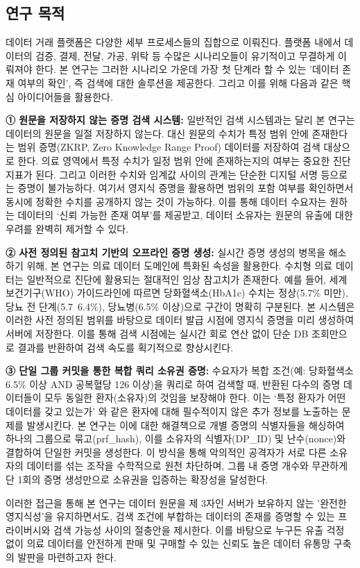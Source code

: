 \subsection{연구 목적}

데이터 거래 플랫폼은 다양한 세부 프로세스들의 집합으로 이뤄진다. 플랫폼 내에서 데이터의 검증, 결제, 전달, 가공, 위탁 등 수많은 시나리오들이 유기적이고 무결하게 이뤄져야 한다. 본 연구는 그러한 시나리오 가운데 가장 첫 단계라 할 수 있는 '데이터 존재 여부의 확인', 즉 검색에 대한 솔루션을 제공한다. 그리고 이를 위해 다음과 같은 핵심 아이디어들을 활용한다.

\bigskip

\textbf{① 원문을 저장하지 않는 증명 검색 시스템:} 일반적인 검색 시스템과는 달리 본 연구는 데이터의 원문을 일절 저장하지 않는다. 대신 원문의 수치가 특정 범위 안에 존재한다는 범위 증명(ZKRP, Zero Knowledge Range Proof) 데이터를 저장하여 검색 대상으로 한다. 의료 영역에서 특정 수치가 일정 범위 안에 존재하는지의 여부는 중요한 진단 지표가 된다. 그리고 이러한 수치와 임계값 사이의 관계는 단순한 디지털 서명 등으로는 증명이 불가능하다. 여기서 영지식 증명을 활용하면 범위의 포함 여부를 확인하면서 동시에 정확한 수치를 공개하지 않는 것이 가능하다. 이를 통해 데이터 수요자는 원하는 데이터의 ‘신뢰 가능한 존재 여부’를 제공받고, 데이터 소유자는 원문의 유출에 대한 우려를 완벽히 제거할 수 있다.

\bigskip

\textbf{② 사전 정의된 참고치 기반의 오프라인 증명 생성:} 실시간 증명 생성의 병목을 해소하기 위해, 본 연구는 의료 데이터 도메인에 특화된 속성을 활용한다. 수치형 의료 데이터는 일반적으로 진단에 활용되는 절대적인 임상 참고치가 존재한다. 예를 들어, 세계보건기구(WHO) 가이드라인\cite{who2011}에 따르면 당화혈색소(HbA1c) 수치는 정상(5.7\% 미만), 당뇨 전 단계(5.7~6.4\%), 당뇨병(6.5\% 이상)으로 구간이 명확히 구분된다. 본 시스템은 이러한 사전 정의된 범위를 바탕으로 데이터 발급 시점에 영지식 증명을 미리 생성하여 서버에 저장한다. 이를 통해 검색 시점에는 실시간 회로 연산 없이 단순 DB 조회만으로 결과를 반환하여 검색 속도를 획기적으로 향상시킨다.

\bigskip

\textbf{③ 단일 그룹 커밋을 통한 복합 쿼리 소유권 증명:} 수요자가 복합 조건(예: 당화혈색소 6.5\% 이상 AND 공복혈당 126 이상)을 쿼리로 하여 검색할 때, 반환된 다수의 증명 데이터들이 모두 동일한 환자(소유자)의 것임을 보장해야 한다. 이는 ‘특정 환자가 어떤 데이터를 갖고 있는가’ 와 같은 환자에 대해 필수적이지 않은 추가 정보를 노출하는 문제를 발생시킨다. 본 연구는 이에 대한 해결책으로 개별 증명의 식별자들을 해싱하여 하나의 그룹으로 묶고(prf\_hash), 이를 소유자의 식별자(DP\_ID) 및 난수(nonce)와 결합하여 단일한 커밋을 생성한다. 이 방식을 통해 악의적인 공격자가 서로 다른 소유자의 데이터를 섞는 조작을 수학적으로 원천 차단하며, 그룹 내 증명 개수와 무관하게 단 1회의 증명 생성만으로 소유권을 입증하는 확장성을 달성한다.

\bigskip

이러한 접근을 통해 본 연구는 데이터 원문을 제 3자인 서버가 보유하지 않는 '완전한 영지식성'을 유지하면서도, 검색 조건에 부합하는 데이터의 존재를 증명할 수 있는 프라이버시와 검색 가능성 사이의 절충안을 제시한다. 이를 바탕으로 누구든 유출 걱정 없이 의료 데이터를 안전하게 판매 및 구매할 수 있는 신뢰도 높은 데이터 유통망 구축의 발판을 마련하고자 한다.